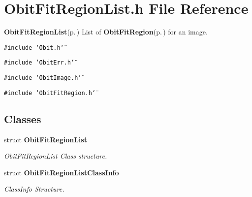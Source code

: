 \section{Obit\-Fit\-Region\-List.h File Reference}
\label{ObitFitRegionList_8h}
{\bf Obit\-Fit\-Region\-List}{\rm (p.\,\pageref{structObitFitRegionList})} List of {\bf Obit\-Fit\-Region}{\rm (p.\,\pageref{structObitFitRegion})} for an image. 

{\tt \#include \char`\"{}Obit.h\char`\"{}}\par
{\tt \#include \char`\"{}Obit\-Err.h\char`\"{}}\par
{\tt \#include \char`\"{}Obit\-Image.h\char`\"{}}\par
{\tt \#include \char`\"{}Obit\-Fit\-Region.h\char`\"{}}\par
\subsection*{Classes}
\begin{CompactItemize}
\item 
struct {\bf Obit\-Fit\-Region\-List}
\begin{CompactList}\small\item\em Obit\-Fit\-Region\-List Class structure. \item\end{CompactList}\item 
struct {\bf Obit\-Fit\-Region\-List\-Class\-Info}
\begin{CompactList}\small\item\em Class\-Info Structure. \item\end{CompactList}\end{CompactItemize}

